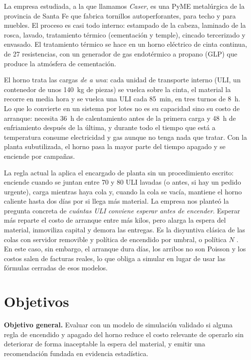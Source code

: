 \documentclass[a4paper,11pt]{article}
\begin{document}
La empresa estudiada, a la que llamamos \emph{Caser}, es una PyME metalúrgica de la provincia de Santa Fe que
fabrica tornillos autoperforantes, para techo y para muebles. El proceso es casi todo interno: estampado de la
cabeza, laminado de la rosca, lavado, tratamiento térmico (cementación y temple), cincado tercerizado y envasado.
El tratamiento térmico se hace en un horno eléctrico de cinta continua, de 27 resistencias, con un generador de
gas endotérmico a propano (GLP) que produce la atmósfera de cementación.

El horno trata las cargas \emph{de a una}: cada unidad de transporte interno (ULI, un contenedor de unos 140~kg de
piezas) se vuelca sobre la cinta, el material la recorre en media hora y se vuelca una ULI cada 85~min, en tres
turnos de 8~h. Lo que lo convierte en un
sistema por lotes no es su capacidad sino su costo de arranque: necesita 36~h de calentamiento antes de la
primera carga y 48~h de enfriamiento después de la última, y durante todo el tiempo que está a temperatura
consume electricidad y gas aunque no tenga nada que tratar. Con la planta subutilizada, el horno pasa la mayor
parte del tiempo apagado y se enciende por campañas.

La regla actual la aplica el encargado de planta sin un procedimiento escrito: enciende cuando se juntan entre
70 y 80 ULI lavadas (o antes, si hay un pedido urgente), carga mientras haya cola y, cuando la cola se vacía,
mantiene el horno caliente hasta dos días por si llega más material. La empresa nos planteó la pregunta
concreta de \emph{cuántas ULI conviene esperar antes de encender}. Esperar más reparte el costo de arranque entre
más kilos, pero alarga la espera del material, inmoviliza capital y demora las entregas. Es la disyuntiva clásica
de las colas con servidor removible y política de encendido por umbral, o política $N$
\citep{yadin1963,heyman1968}. En este caso, sin embargo, el arranque dura días, los arribos no son Poisson y los
costos salen de facturas reales, lo que obliga a simular en lugar de usar las fórmulas cerradas de esos modelos.

\section{Objetivos}

\textbf{Objetivo general.} Evaluar con un modelo de simulación validado si alguna regla de encendido y apagado
del horno reduce el costo relevante de operarlo sin deteriorar de forma inaceptable la espera del material, y
emitir una recomendación fundada en evidencia estadística.
\end{document}

